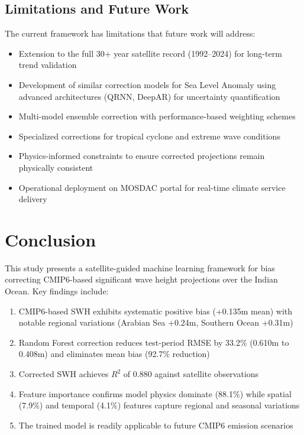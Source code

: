 \documentclass[conference]{IEEEtran}
\begin{document}
\subsection{Limitations and Future Work}

The current framework has limitations that future work will address:
\begin{itemize}
    \item Extension to the full 30+ year satellite record (1992--2024) for long-term trend validation
    \item Development of similar correction models for Sea Level Anomaly using advanced architectures (QRNN, DeepAR) for uncertainty quantification
    \item Multi-model ensemble correction with performance-based weighting schemes
    \item Specialized corrections for tropical cyclone and extreme wave conditions
    \item Physics-informed constraints to ensure corrected projections remain physically consistent
    \item Operational deployment on MOSDAC portal for real-time climate service delivery
\end{itemize}

\section{Conclusion}

This study presents a satellite-guided machine learning framework for bias correcting CMIP6-based significant wave height projections over the Indian Ocean. Key findings include:

\begin{enumerate}
    \item CMIP6-based SWH exhibits systematic positive bias (+0.135m mean) with notable regional variations (Arabian Sea +0.24m, Southern Ocean +0.31m)
    \item Random Forest correction reduces test-period RMSE by 33.2\% (0.610m to 0.408m) and eliminates mean bias (92.7\% reduction)
    \item Corrected SWH achieves $R^2$ of 0.880 against satellite observations
    \item Feature importance confirms model physics dominate (88.1\%) while spatial (7.9\%) and temporal (4.1\%) features capture regional and seasonal variations
    \item The trained model is readily applicable to future CMIP6 emission scenarios
\end{enumerate}
\end{document}
